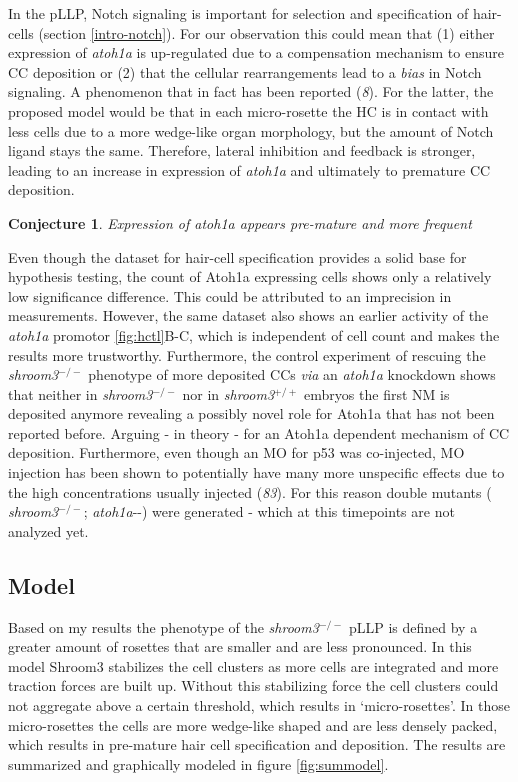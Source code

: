 \documentclass[11pt,singlespacinge,twoside]{reedthesis} %
\newtheorem{conjecture}{Conjecture}[chapter]
\theoremstyle{definition}
\theoremstyle{definition}
\theoremstyle{definition}
\theoremstyle{remark}
\begin{document}
In the pLLP, Notch signaling is important for selection and specification of hair-cells (section \ref{intro-notch}). For our observation this could mean that (1) either expression of \emph{atoh1a} is up-regulated due to a compensation mechanism to ensure CC deposition or (2) that the cellular rearrangements lead to a \emph{bias} in Notch signaling. A phenomenon that in fact has been reported (\emph{8}). For the latter, the proposed model would be that in each micro-rosette the HC is in contact with less cells due to a more wedge-like organ morphology, but the amount of Notch ligand stays the same. Therefore, lateral inhibition and feedback is stronger, leading to an increase in expression of \emph{atoh1a} and ultimately to premature CC deposition.
\begin{conjecture}
\protect\hypertarget{cnj:unnamed-chunk-17}{}{\label{cnj:unnamed-chunk-17} }Expression of atoh1a appears pre-mature and more frequent
\end{conjecture}
Even though the dataset for hair-cell specification provides a solid base for hypothesis testing, the count of Atoh1a expressing cells shows only a relatively low significance difference. This could be attributed to an imprecision in measurements. However, the same dataset also shows an earlier activity of the \emph{atoh1a} promotor \ref{fig:hctl}B-C, which is independent of cell count and makes the results more trustworthy. Furthermore, the control experiment of rescuing the \emph{shroom3}\(^{-/-}\) phenotype of more deposited CCs \emph{via} an \emph{atoh1a} knockdown shows that neither in \emph{shroom3}\(^{-/-}\) nor in \emph{shroom3}\(^{+/+}\) embryos the first NM is deposited anymore revealing a possibly novel role for Atoh1a that has not been reported before. Arguing - in theory - for an Atoh1a dependent mechanism of CC deposition. Furthermore, even though an MO for p53 was co-injected, MO injection has been shown to potentially have many more unspecific effects due to the high concentrations usually injected (\emph{83}). For this reason double mutants ( \emph{shroom3}\(^{-/-}\); \emph{atoh1a}-\/-) were generated - which at this timepoints are not analyzed yet.

\hypertarget{model-2}{%
\subsection{Model}\label{model-2}}

Based on my results the phenotype of the \emph{shroom3}\(^{-/-}\) pLLP is defined by a greater amount of rosettes that are smaller and are less pronounced. In this model Shroom3 stabilizes the cell clusters as more cells are integrated and more traction forces are built up. Without this stabilizing force the cell clusters could not aggregate above a certain threshold, which results in `micro-rosettes'. In those micro-rosettes the cells are more wedge-like shaped and are less densely packed, which results in pre-mature hair cell specification and deposition. The results are summarized and graphically modeled in figure \ref{fig:summodel}.
\end{document}
